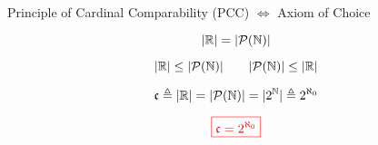 \begin{frame}{}
  \begin{center}
    {\large {}}
  \end{center}

  \pause
  \vspace{0.50cm}
  \begin{theorem}[PCC]
    \begin{center}
      Principle of Cardinal Comparability (PCC) $\iff$ Axiom of Choice
    \end{center}
  \end{theorem}
\end{frame}

\begin{frame}{}
  \begin{theorem}[]
    \[
      |\mathbb{R}| = |\mathcal{P}(\mathbb{N})|
    \]
  \end{theorem}

  \pause
  \[
    |\mathbb{R}| \le |\mathcal{P}(\mathbb{N})|  \qquad |\mathcal{P}(\mathbb{N})| \le |\mathbb{R}|
  \]

  \pause
  \[
    \mathfrak{c} \triangleq |\mathbb{R}| = |\mathcal{P}(\mathbb{N})| = |2^{\mathbb{N}}| \triangleq 2^{\aleph_{0}}
  \]

  \pause
  \[
    \textcolor{red}{\boxed{\mathfrak{c} = 2^{\aleph_{0}}}}
  \]
\end{frame}
